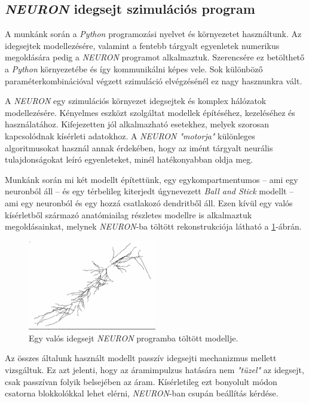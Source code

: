 \subsection{\textit{NEURON} idegsejt szimulációs program}
A munkánk során a \textit{Python} programozási nyelvet és környezetet használtunk. Az idegsejtek modellezésére, valamint a fentebb tárgyalt egyenletek numerikus megoldására pedig a \textit{NEURON} programot alkalmaztuk. Szerencsére ez betölthető a \textit{Python} környezetébe és így kommunikálni képes vele. Sok különböző paraméterkombinációval végzett szimuláció elvégzésénél ez nagy hasznunkra vált.

A \textit{NEURON} egy szimulációs környezet idegsejtek és komplex hálózatok modellezésére. Kényelmes eszközt szolgáltat modellek építéséhez, kezeléséhez és használatához. Kifejezetten jól alkalmazható esetekhez, melyek szorosan kapcsolódnak kísérleti adatokhoz. A \textit{NEURON "motorja"} különleges algoritmusokat használ annak érdekében, hogy az imént tárgyalt neurális tulajdonságokat leíró egyenleteket, minél hatékonyabban oldja meg. 

Munkánk során mi két modellt építettünk, egy egykompartmentumos -- ami egy neuronból áll -- és egy térbelileg kiterjedt úgynevezett \textit{Ball and Stick} modellt -- ami egy neuronból és egy hozzá csatlakozó dendritből áll. Ezen kívül egy valós kísérletből származó anatómiailag részletes modellre is alkalmaztuk megoldásainkat, melynek \textit{NEURON}-ba töltött rekonstrukciója látható a \ref{fig:morph}-ábrán.

\begin{figure}[h!]
	\centering
	\includegraphics[width=0.5\textwidth]{./fig/morph.png}
	\caption[Kísérletből származó morfológia]{Egy valós idegsejt \textit{NEURON} programba töltött modellje.}
	\label{fig:morph}
\end{figure}


Az összes általunk használt modellt passzív idegsejti mechanizmus mellett vizsgáltuk. Ez azt jelenti, hogy az áramimpulzus hatására nem \textit{"tüzel"} az idegsejt, csak passzívan folyik belsejében az áram. Kísérletileg ezt bonyolult módon csatorna blokkolókkal lehet elérni, \textit{NEURON}-ban csupán beállítás kérdése.

